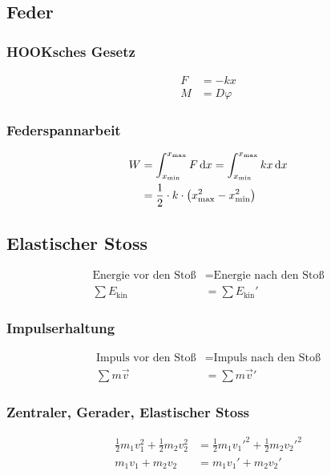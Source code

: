 \subsection{Feder}

\begin{multicols}{2}{}
\subsubsection{HOOKsches Gesetz}
\begin{align*}
F&=-kx\\
M&=D\varphi
\end{align*}


\subsubsection{Federspannarbeit}
\begin{align*}
W	&=\int_{x_\text{min}}^{x_\text{max}}F\mathop{}\!\mathrm{d} x=\int_{x_\text{min}}^{x_\text{max}}kx\mathop{}\!\mathrm{d} x\\
	&=\frac{1}{2}\cdot k\cdot \left(x_{\text{max}}^2-x_{\text{min}}^2\right)
\end{align*}
\end{multicols}


\newpage
\subsection{Elastischer Stoss}

\begin{align*}
\text{Energie vor den Stoß} &= \text{Energie nach den Stoß}\nonumber\\
\sum E_{\text{kin}}&=\sum E_{\text{kin}}'
\end{align*}


\subsubsection{Impulserhaltung}
\begin{align*}
\text{Impuls vor den Stoß} &= \text{Impuls nach den Stoß}\nonumber\\
\sum m\vec{v}&= \sum m\vec{v}'
\end{align*}


\subsubsection{Zentraler, Gerader, Elastischer Stoss}
\begin{align*}
\frac{1}{2}m_1v_1^2+\frac{1}{2}m_2v_2^2&=\frac{1}{2}m_1v_1'^2+\frac{1}{2}m_2v_2'^2\\
m_1v_1+m_2v_2&=m_1v_1'+m_2v_2'
\end{align*}

